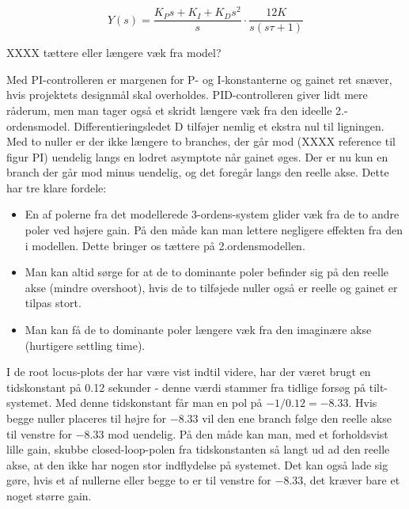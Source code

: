 \begin{equation}\label{eq:PID_OpenLoop}
Y(s)=\frac{K_{P}s+K_{I}+K_{D}s^2}{s}\cdot\frac{12K}{s(s\tau+1)}
\end{equation}


XXXX tættere eller længere væk fra model?

Med PI-controlleren er margenen for P- og I-konstanterne og gainet ret snæver, hvis projektets designmål skal overholdes. PID-controlleren giver lidt mere råderum, men man tager også et skridt længere væk fra den ideelle 2.-ordensmodel. Differentieringsledet D tilføjer nemlig et ekstra nul til ligningen. Med to nuller er der ikke længere to branches, der går mod (XXXX reference til figur PI) uendelig langs en lodret asymptote når gainet øges. Der er nu kun en branch der går mod minus uendelig, og det foregår langs den reelle akse. Dette har tre klare fordele:

\begin{itemize}
	\item 	En af polerne fra det modellerede 3-ordens-system glider væk fra de to andre poler ved højere gain. På den måde kan man lettere negligere effekten fra den i modellen. Dette bringer os tættere på 2.ordensmodellen.
	\item  	Man kan altid sørge for at de to dominante poler befinder sig på den 				   	reelle akse (mindre overshoot), hvis de to tilføjede nuller også er reelle og gainet er tilpas stort. 
	\item  	Man kan få de to dominante poler længere væk fra den imaginære akse 					(hurtigere settling time).
\end{itemize}

I de root locus-plots der har være vist indtil videre, har der været brugt en tidskonstant på 0.12 sekunder - denne værdi stammer fra tidlige forsøg på tilt-systemet. Med denne tidskonstant får man en pol på $-1/0.12=-8.33$. Hvis begge nuller placeres til højre for $-8.33$ vil den ene branch følge den reelle akse til venstre for $-8.33$ mod uendelig. På den måde kan man, med et forholdsvist lille gain, skubbe closed-loop-polen fra tidskonstanten så langt ud ad den reelle akse, at den ikke har nogen stor indflydelse på systemet. Det kan også lade sig gøre, hvis et af nullerne eller begge to er til venstre for $-8.33$, det kræver bare et noget større gain.

